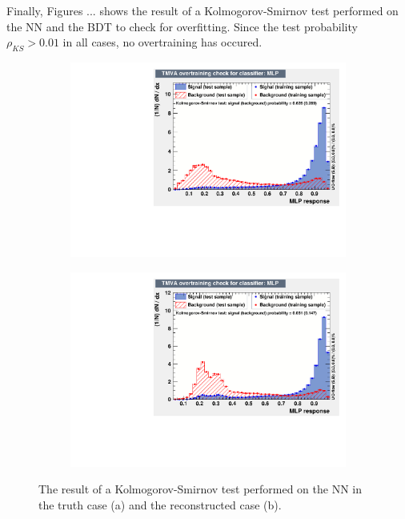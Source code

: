 \documentclass[10pt,a4paper]{book}
\begin{document}
Finally, Figures ... shows the result of a Kolmogorov-Smirnov test \cite{10.2307/2280095} performed on the NN and the BDT to check for overfitting. Since the test probability $\rho_{KS} > 0.01$ in all cases, no overtraining has occured. 

\begin{figure}[h]
\begin{subfigure}{1.0\textwidth}
\centering
\includegraphics[scale=0.7]{ch4_images/MLP_overtraining_truth.pdf}
\caption{}
\end{subfigure}
\begin{subfigure}{1.0\textwidth}
\centering
\includegraphics[scale=0.7]{ch4_images/MLP_overtraining_reco.pdf}
\caption{}
\end{subfigure}
\caption{The result of a Kolmogorov-Smirnov test performed on the NN in the truth case (a) and the reconstructed case (b).}
\label{correlation reco}
\end{figure} 
\end{document}
